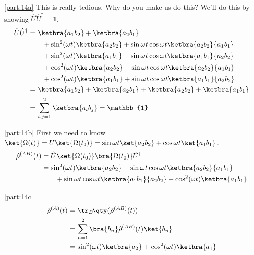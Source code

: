 \documentclass[boxes,pages]{homework}
\makeatletter
\numberwithin{@problem}{section}
\makeatother
\begin{document}
\begin{solution}
	\ref{part:14a}
	This is really tedious. Why do you make us do this? We'll do this by showing $\hat{U}\hat{U}^\dagger = \mathbb{1}$.
	\begin{align*}
		\hat{U}\hat{U}^\dagger & = \ketbra{a_1b_2} + \ketbra{a_2b_1}                                                            \\
		                       & \qquad + \sin^2(\omega t)\ketbra{a_2b_2} + \sin{\omega t}\cos{\omega t}\ketbra{a_2b_2}{a_1b_1} \\
		                       & \qquad + \sin^2(\omega t)\ketbra{a_1b_1} - \sin{\omega t}\cos{\omega t}\ketbra{a_1b_1}{a_2b_2} \\
		                       & \qquad + \cos^2(\omega t)\ketbra{a_2b_2} - \sin{\omega t}\cos{\omega t}\ketbra{a_2b_2}{a_1b_1} \\
		                       & \qquad + \cos^2(\omega t)\ketbra{a_1b_1} + \sin{\omega t}\cos{\omega t}\ketbra{a_1b_1}{a_2b_2} \\
		                       & = \ketbra{a_1b_2} + \ketbra{a_2b_1} + \ketbra{a_2b_2} + \ketbra{a_1b_1}                        \\
		                       & = \sum_{i,j = 1}^2\ketbra{a_ib_j} = \mathbb{1}
	\end{align*}

	\ref{part:14b}
	First we need to know $\ket{\Omega(t)} = U\ket{\Omega(t_0)} = \sin{\omega t}\ket{a_2b_2} + \cos{\omega t}\ket{a_1b_1}$.
	\begin{align*}
		\hat{\rho}^{(AB)}(t) & = \hat{U}\ket{\Omega(t_0)}\bra{\Omega(t_0)}\hat{U}^\dagger                                     \\
		                     & = \sin^2(\omega t)\ketbra{a_2b_2} + \sin{\omega t}\cos{\omega t}\ketbra{a_2b_2}{a_1b_1}        \\
		                     & \qquad + \sin{\omega t}\cos{\omega t}\ketbra{a_1b_1}{a_2b_2} + \cos^2(\omega t)\ketbra{a_1b_1}
	\end{align*}

	\ref{part:14c}
	\begin{align*}
		\hat{\rho}^{(A)}(t) & = \tr_B\!\qty(\hat{\rho}^{(AB)}(t))                           \\
		                    & = \sum_{n = 1}^2\bra{b_n}\hat{\rho}^{(AB)}(t)\ket{b_n}        \\
		                    & = \sin^2(\omega t)\ketbra{a_2} + \cos^2(\omega t)\ketbra{a_1}
	\end{align*}


\end{solution}
\end{document}
